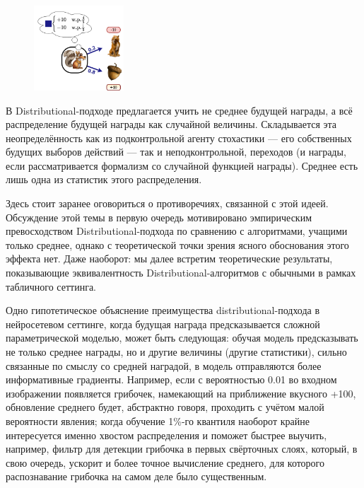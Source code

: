 \begin{figure}
\vspace{-0.3cm}
\centering
\includegraphics[width=0.3\textwidth]{Images/DistributionalRL2.png}
\vspace{-0.3cm}
\end{figure}
В Distributional-подходе предлагается учить не среднее будущей награды, а всё распределение будущей награды как случайной величины. Складывается эта неопределённость как из подконтрольной агенту стохастики --- его собственных будущих выборов действий --- так и неподконтрольной, переходов (и награды, если рассматривается формализм со случайной функцией награды). Среднее есть лишь одна из статистик этого распределения. 

Здесь стоит заранее оговориться о противоречиях, связанной с этой идеей. Обсуждение этой темы в первую очередь мотивировано эмпирическим превосходством Distributional-подхода по сравнению с алгоритмами, учащими только среднее, однако с теоретической точки зрения ясного обоснования этого эффекта нет. Даже наоборот: мы далее встретим теоретические результаты, показывающие эквивалентность Distributional-алгоритмов с обычными в рамках табличного сеттинга. 

Одно гипотетическое объяснение преимущества distributional-подхода в нейросетевом сеттинге, когда будущая награда предсказывается сложной параметрической моделью, может быть следующая: обучая модель предсказывать не только среднее награды, но и другие величины (другие статистики), сильно связанные по смыслу со средней наградой, в модель отправляются более информативные градиенты. Например, если с вероятностью 0.01 во входном изображении появляется грибочек, намекающий на приближение вкусного +100, обновление среднего будет, абстрактно говоря, проходить с учётом малой вероятности явления; когда обучение 1\%-го квантиля наоборот крайне интересуется именно хвостом распределения и поможет быстрее выучить, например, фильтр для детекции грибочка в первых свёрточных слоях, который, в свою очередь, ускорит и более точное вычисление среднего, для которого распознавание грибочка на самом деле было существенным.

